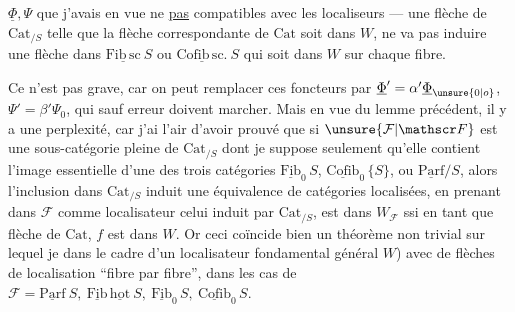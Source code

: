 
$\underline{\Phi},\Psi$ que j'avais en vue ne   \uline{pas}  compatibles avec les localiseurs --- une flèche  de $\mathrm{Cat}_{/S}$  telle que la flèche correspondante de $\mathrm{Cat}$ soit dans $W$, ne va pas induire une flèche dans $\underline{\mathrm{Fib}\,\mathrm{sc}}\ S$ ou $\underline{\mathrm{Cofib}\,\mathrm{sc}.}\ S$ qui soit dans $W$ sur chaque fibre.

Ce n'est pas grave, car on peut  remplacer ces foncteurs par $\underline{\Phi}'=\alpha'\underline{\Phi}_{\unsure{0|o}}$, $\Psi'=\beta'\Psi_0$, qui sauf erreur doivent marcher. Mais en vue du lemme précédent, il y a une perplexité, car j'ai l'air d'avoir prouvé que si $\unsure{\mathcal F|\mathscr F}$ est une sous-catégorie pleine de $\mathrm{Cat}_{/S}$ \unsure{\{} dont je suppose seulement qu'elle contient  l'image essentielle d'une des trois catégories $\underline{\mathrm{Fib}}_0\,S$, $\underline{\mathrm{Cofib}}_0\,\{S\}$, ou $\underline{\mathrm{Parf}}/S$, alors l'inclusion dans $\mathrm{Cat}_{/S}$ induit une équivalence de catégories localisées, en prenant dans $\mathcal F$ comme localisateur celui induit par $\mathrm{Cat}_{/S}$, 
est dans $W_{\mathcal F}$ ssi en tant que flèche de $\mathrm{Cat}$, $f$ est dans $W$. Or ceci coïncide bien   un théorème non trivial sur lequel je   dans le cadre d'un localisateur fondamental général $W$) avec  de flèches de localisation ``fibre par fibre'', dans les cas de $\mathcal F=\underline{\mathrm{Parf}}\ S,\ \underline{\mathrm{Fib}}\,\underline{\mathrm{hot}}\ S,\ \underline{\mathrm{Fib}}_0\,S,\ \underline{\mathrm{Cofib}}_0\,S$.

